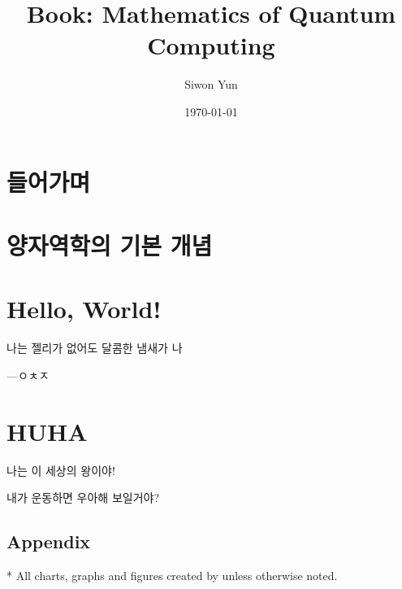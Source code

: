 \documentclass[openany]{book}
\title{Book: Mathematics of Quantum Computing}
\author{Siwon Yun}
\date{\today}
\begin{document}
\maketitle

\toctrue
\tableofcontents
\tocfalse

\newpage

\chapter{들어가며}


\chapter{양자역학의 기본 개념}


\chapter{Hello, World!}

\epigraph{나는 젤리가 없어도 달콤한 냄새가 나}{---ㅇㅊㅈ}
% 	

\chapter{HUHA}
나는 이 세상의 왕이야!

내가 운동하면 우아해 보일거야?
%   

\begin{appendices}
\chapter{Appendix}
%   
\end{appendices}

\toctrue

* All charts, graphs and figures created by \printauthor{} unless otherwise noted.


\tocfalse
\end{document}
